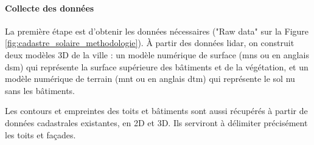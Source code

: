 {\paragraph{Collecte des données}
\par{La première étape est d'obtenir les données nécessaires ("Raw data" sur la Figure \ref{fig:cadastre_solaire_methodologie}). À partir des données \gls{lidar}, on construit deux modèles 3D de la ville : un modèle numérique de surface (\acrshort{mns} ou en anglais \acrshort{dsm}) qui représente la surface supérieure des bâtiments et de la végétation, et un modèle numérique de terrain (\acrshort{mnt} ou en anglais \acrshort{dtm}) qui représente le sol nu sans les bâtiments.}
\par{Les contours et empreintes des toits et bâtiments  sont aussi récupérés à partir de données cadastrales existantes, en 2D et 3D. Ils serviront à délimiter précisément les toits et façades.}

}
